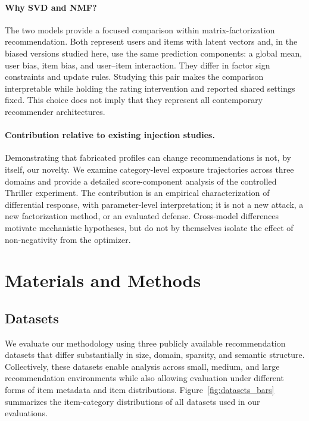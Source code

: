 \documentclass[information,article,submit,pdftex,moreauthors]{Definitions/mdpi}
\newif\ifrevisionnotes
\newcommand{\saracomment}[1]{\ifrevisionnotes\par\smallskip\noindent\textcolor{orange}{\textbf{Sara:} #1}\par\smallskip\fi}
\begin{document}
\saracomment{Added the rationale for using two established models and clarified the contribution relative to poisoning research. The contribution is the comparative category-exposure and fitted-parameter analysis, not a new recommender or injection algorithm.}

\paragraph{Why SVD and NMF?}
The two models provide a focused comparison within matrix-factorization recommendation. Both represent users and items with latent vectors and, in the biased versions studied here, use the same prediction components: a global mean, user bias, item bias, and user--item interaction. They differ in factor sign constraints and update rules. Studying this pair makes the comparison interpretable while holding the rating intervention and reported shared settings fixed. This choice does not imply that they represent all contemporary recommender architectures.

\paragraph{Contribution relative to existing injection studies.}
Demonstrating that fabricated profiles can change recommendations is not, by itself, our novelty. We examine category-level exposure trajectories across three domains and provide a detailed score-component analysis of the controlled Thriller experiment. The contribution is an empirical characterization of differential response, with parameter-level interpretation; it is not a new attack, a new factorization method, or an evaluated defense. Cross-model differences motivate mechanistic hypotheses, but do not by themselves isolate the effect of non-negativity from the optimizer.


\section{Materials and Methods}
\label{sec:materials-methods}
\label{sec:methodology}
\subsection{Datasets}
\label{sec:datasets}

We evaluate our methodology using three publicly available recommendation datasets that differ substantially in size, domain, sparsity, and semantic structure. Collectively, these datasets enable analysis across small, medium, and large recommendation environments while also allowing evaluation under different forms of item metadata and item distributions. Figure~\ref{fig:datasets_bars} summarizes the item-category distributions of all datasets used in our evaluations.
\end{document}
